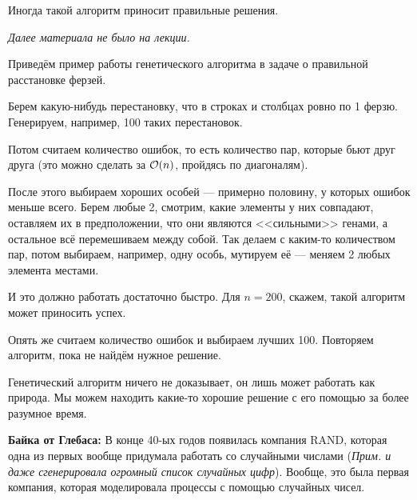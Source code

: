 Иногда такой алгоритм приносит правильные решения. 

{\it Далее материала не было на лекции.}

Приведём пример работы генетического алгоритма в задаче о правильной
расстановке ферзей.

Берем какую-нибудь перестановку, что в строках и столбцах ровно по 1 ферзю.
Генерируем, например, 100 таких перестановок.

Потом считаем количество ошибок, то есть количество пар, которые бьют друг
друга (это можно сделать за $\mathcal{O}(n)$, пройдясь по диагоналям).

После этого выбираем хороших особей --- примерно половину, у которых ошибок
меньше всего. Берем любые 2, смотрим, какие элементы у них совпадают, оставляем
их в предположении, что они являются <<сильными>> генами, а остальное всё
перемешиваем между собой. Так делаем с каким-то количеством пар, потом
выбираем, например, одну особь, мутируем её --- меняем 2 любых элемента местами.

И это должно работать достаточно быстро. Для $n = 200$, скажем, такой
алгоритм может приносить успех.

Опять же считаем количество ошибок и выбираем лучших 100. Повторяем алгоритм,
пока не найдём нужное решение.

Генетический алгоритм ничего не доказывает, он лишь может работать как природа.
Мы можем находить какие-то хорошие решение с его помощью за более разумное время.

{\bf Байка от Глебаса:}
  В конце 40-ых годов появилась компания RAND, которая одна из первых вообще
  придумала работать со случайными числами ({\it Прим. и даже сгенерировала 
  огромный список случайных цифр}). Вообще, это была первая компания, которая
  моделировала процессы с помощью случайных чисел.


% 
